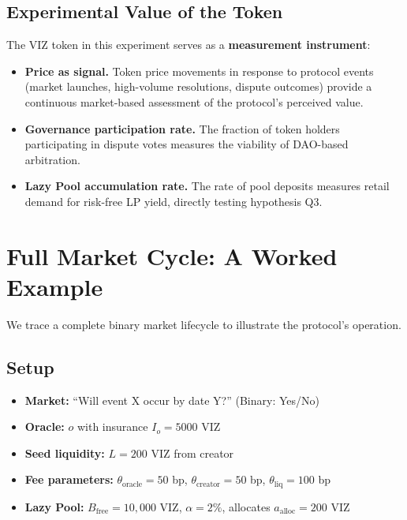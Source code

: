 \documentclass{ledger}
\theoremstyle{plain}
\theoremstyle{remark}
\begin{document}
\subsection{Experimental Value of the Token}

The VIZ token in this experiment serves as a \textbf{measurement instrument}:

\begin{itemize}
  \item \textbf{Price as signal.} Token price movements in response to protocol
  events (market launches, high-volume resolutions, dispute outcomes) provide a
  continuous market-based assessment of the protocol's perceived value.
  \item \textbf{Governance participation rate.} The fraction of token holders
  participating in dispute votes measures the viability of DAO-based arbitration.
  \item \textbf{Lazy Pool accumulation rate.} The rate of pool deposits measures
  retail demand for risk-free LP yield, directly testing hypothesis Q3.
\end{itemize}

\section{Full Market Cycle: A Worked Example}\label{sec:example}

We trace a complete binary market lifecycle to illustrate the protocol's
operation.

\subsection{Setup}

\begin{itemize}
  \item \textbf{Market:} ``Will event X occur by date Y?'' (Binary: Yes/No)
  \item \textbf{Oracle:} $o$ with insurance $I_o = 5000$ VIZ
  \item \textbf{Seed liquidity:} $L = 200$ VIZ from creator
  \item \textbf{Fee parameters:} $\theta_{\text{oracle}} = 50$ bp,
  $\theta_{\text{creator}} = 50$ bp, $\theta_{\text{liq}} = 100$ bp
  \item \textbf{Lazy Pool:} $B_{\text{free}} = 10{,}000$ VIZ, $\alpha = 2\%$,
  allocates $a_{\text{alloc}} = 200$ VIZ
\end{itemize}
\end{document}
